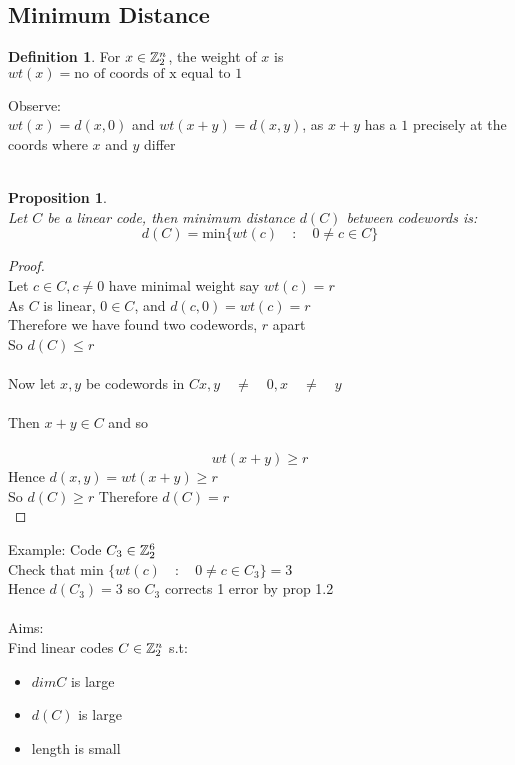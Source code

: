 \documentclass[]{article}
\newtheorem{prop}[thm]{Proposition}
\theoremstyle{definition}
\newtheorem*{defn}{Definition}
\theoremstyle{remark}
\numberwithin{equation}{section}
\begin{document}
	\subsection{Minimum Distance}
		\begin{defn}
			For $x \in \mathbb{Z}_2^n$, the weight of $x$ is $wt(x) = \text{no of coords of x equal to 1}$
		\end{defn}
		Observe:\\
		$wt(x) = d(x, 0)$ and $wt(x+y) = d(x,y)$, as $x+y$ has a $1$ precisely at the coords where $x$ and $y$ differ\\
		\\
		\begin{prop}\hfill\\
		Let $C$ be a linear code, then minimum distance $d(C)$ between codewords is:\\
		\[
			d(C) = \text{min} \{ wt(c)\quad:\quad 0 \neq c \in C\}
		\]
		\end{prop}
		\begin{proof}\hfill\\
		Let $c \in C, c \neq 0$ have minimal weight say $wt(c) = r$\\
		As $C$ is linear, $0 \in C$, and $d(c,0) = wt(c) = r$\\
		Therefore we have found two codewords, $r$ apart\\
		So $d(C) \leq r$\\
		\\
		Now let $x,y$ be codewords in $C x,y\quad \neq \quad 0, x\quad \neq \quad y$\\
		\\
		Then $x+y \in C$ and so \\
		\\
		\[
			wt(x+y)\geq r
		\]
		Hence $d(x,y) = wt(x+y) \geq r$ \\
		So $d(C) \geq r$ Therefore $d(C) = r$\\
		\end{proof}
		Example:
		Code $C_3 \in \mathbb{Z}_2^6$\\
		Check that min $\{wt(c) \quad:\quad 0 \neq c \in C_3\} = 3$\\
		Hence $d(C_3) = 3$ so $C_3$ corrects 1 error by prop 1.2\\
		\\

		Aims:\\
		Find linear codes $C \in \mathbb{Z}_2^n$ s.t:\\
		\begin{itemize}
		\item $dimC$ is large
		\item $d(C)$ is large
		\item length is small
		\end{itemize}
\end{document}
